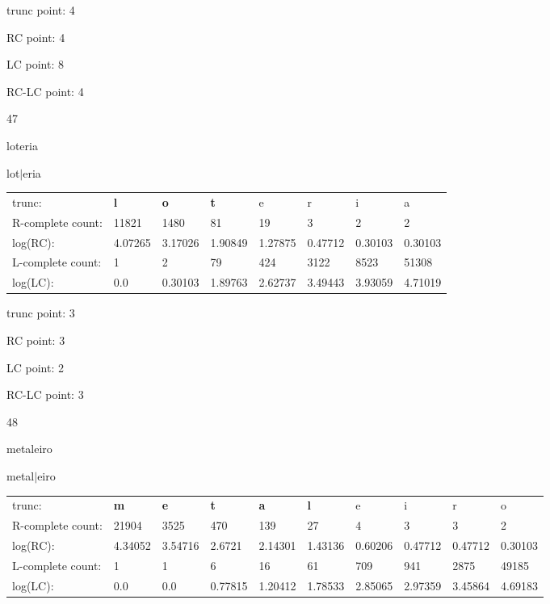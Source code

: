 \documentclass{article}
\begin{document}
trunc point: 4

RC point: 4

LC point: 8

RC-LC point: 4

\vspace{3em}



47

loteria

lot$|$eria

\vspace{1em}

\begin{tabular}{l|lllllll}

trunc: & {\color{red}\bf l} & {\color{red}\bf o} & {\color{red}\bf t} & e & r & i & a \\ 
R-complete count: & 11821 & 1480 & 81 & 19 & 3 & 2 & 2 \\ 
log(RC): & 4.07265 & 3.17026 & 1.90849 & 1.27875 & 0.47712 & 0.30103 & 0.30103 \\ 
L-complete count: & 1 & 2 & 79 & 424 & 3122 & 8523 & 51308 \\ 
log(LC): & 0.0 & 0.30103 & 1.89763 & 2.62737 & 3.49443 & 3.93059 & 4.71019 \\ 
\end{tabular}

trunc point: 3

RC point: 3

LC point: 2

RC-LC point: 3

\vspace{3em}



48

metaleiro

metal$|$eiro

\vspace{1em}

\begin{tabular}{l|lllllllll}

trunc: & {\color{red}\bf m} & {\color{red}\bf e} & {\color{red}\bf t} & {\color{red}\bf a} & {\color{red}\bf l} & e & i & r & o \\ 
R-complete count: & 21904 & 3525 & 470 & 139 & 27 & 4 & 3 & 3 & 2 \\ 
log(RC): & 4.34052 & 3.54716 & 2.6721 & 2.14301 & 1.43136 & 0.60206 & 0.47712 & 0.47712 & 0.30103 \\ 
L-complete count: & 1 & 1 & 6 & 16 & 61 & 709 & 941 & 2875 & 49185 \\ 
log(LC): & 0.0 & 0.0 & 0.77815 & 1.20412 & 1.78533 & 2.85065 & 2.97359 & 3.45864 & 4.69183 \\ 
\end{tabular}
\end{document}
